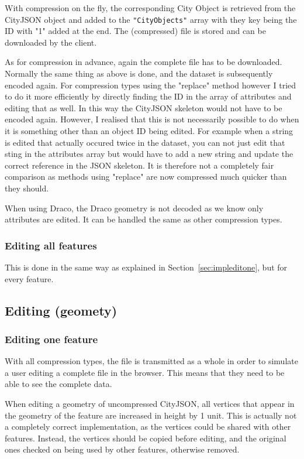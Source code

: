 With compression on the fly, the corresponding City Object is retrieved from the CityJSON object and added to the \texttt{"CityObjects"} array with they key being the ID with "1" added at the end.
The (compressed) file is stored and can be downloaded by the client.

As for compression in advance, again the complete file has to be downloaded.
Normally the same thing as above is done, and the dataset is subsequently encoded again.
For compression types using the "replace" method however I tried to do it more efficiently by directly finding the ID in the array of attributes and editing that as well.
In this way the CityJSON skeleton would not have to be encoded again.
However, I realised that this is not necessarily possible to do when it is something other than an object ID being edited.
For example when a string is edited that actually occured twice in the dataset, you can not just edit that sting in the attributes array but would have to add a new string and update the correct reference in the JSON skeleton.
It is therefore not a completely fair comparison as methods using "replace" are now compressed much quicker than they should.

When using Draco, the Draco geometry is not decoded as we know only attributes are edited.
It can be handled the same as other compression types.


\subsubsection{Editing all features}
This is done in the same way as explained in Section~\ref{sec:impleditone}, but for every feature.




\subsection{Editing (geomety)}
\subsubsection{Editing one feature}
\label{sec:impleditgeomone}

With all compression types, the file is transmitted as a whole in order to simulate a user editing a complete file in the browser.
This means that they need to be able to see the complete data.

When editing a geometry of uncompressed CityJSON, all vertices that appear in the geometry of the feature are increased in height by 1 unit.
This is actually not a completely correct implementation, as the vertices could be shared with other features.
Instead, the vertices should be copied before editing, and the original ones checked on being used by other features, otherwise removed.

